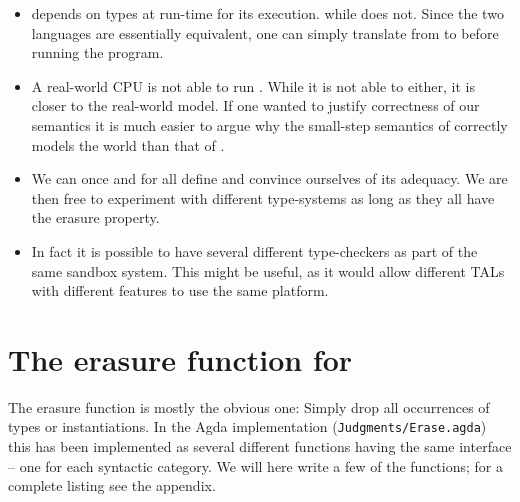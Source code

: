 \begin{itemize}
\item \ATAL depends on types at run-time for its execution. while \ATALe does
  not. Since the two languages are essentially equivalent, one can simply
  translate from \ATAL to \ATALe before running the program.
\item A real-world CPU is not able to run \ATAL. While it is not able to \ATALe
  either, it is closer to the real-world model. If one wanted to justify
  correctness of our semantics it is much easier to argue why the small-step
  semantics of \ATALe correctly models the world than that of \ATAL.
\item We can once and for all define \ATALe and convince ourselves of its
  adequacy. We are then free to experiment with different type-systems as long
  as they all have the erasure property.
\item In fact it is possible to have several different type-checkers as part of
  the same sandbox system. This might be useful, as it would allow different
  TALs with different features to use the same platform.
\end{itemize}

\section{The erasure function for \ATAL}

The erasure function is mostly the obvious one: Simply drop all occurrences of
types or instantiations. In the Agda implementation
(\texttt{Judgments/Erase.agda}) this has been implemented as several different
functions having the same interface -- one for each syntactic category. We will
here write a few of the functions; for a complete listing see the
appendix.

